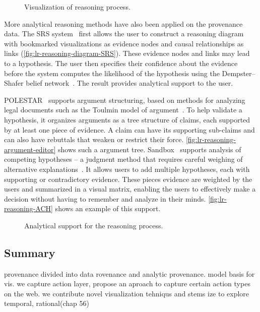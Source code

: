 \begin{figure}[!htb]
\centering
{}
\hfill
{}
\caption{Visualization of reasoning process.}
\end{figure}

More analytical reasoning methods have also been applied on the provenance data. The SRS system~\cite{Pike2009} first allows the user to construct a reasoning diagram with bookmarked visualizations as evidence nodes and causal relationships as links (\autoref{fig:lr-reasoning-diagram-SRS}). These evidence nodes and links may lead to a hypothesis. The user then specifies their confidence about the evidence before the system computes the likelihood of the hypothesis using the Dempster–Shafer belief network~\cite{Sanfilippo2007}. The result provides analytical support to the user. 

POLESTAR~\cite{Pioch2006} supports argument structuring, based on methods for analyzing legal documents such as the Toulmin model of argument~\cite{Toulmin2003}. To help validate a hypothesis, it organizes arguments as a tree structure of claims, each supported by at least one piece of evidence. A claim can have its supporting sub-claims and can also have rebuttals that weaken or restrict their force. \autoref{fig:lr-reasoning-argument-editor} shows such a argument tree. Sandbox~\cite{Wright2006} supports analysis of competing hypotheses -- a judgment method that requires careful weighing of alternative explanations~\cite{Heuer1999}. It allows users to add multiple hypotheses, each with supporting or contradictory evidence. These pieces evidence are weighted by the users and summarized in a visual matrix, enabling the users to effectively make a decision without having to remember and analyze in their minds. \autoref{fig:lr-reasoning-ACH} shows an example of this support.

\begin{figure}[!htb]
\centering
{}
\hfill
{}
\caption{Analytical support for the reasoning process.}
\label{fig:lr-reasoning}
\end{figure}

\subsection{Summary}
provenance divided into data rovenance and analytic provenance. model basis for vis. we capture action layer, propose an aproach to capture certain action types on the web. we contribute novel visualization tehniqus and stems ize to explore temporal, rational(chap 56)